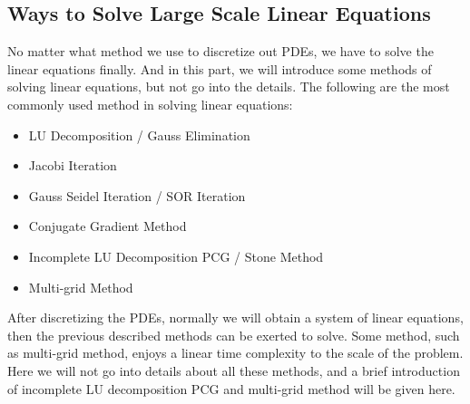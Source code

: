 \documentclass[english, nochinese]{pkupaper}
\begin{document}
\subsection{Ways to Solve Large Scale Linear Equations}
\par No matter what method we use to discretize out PDEs, we have to solve the linear equations finally. And in this part, we will introduce some methods of solving linear equations, but not go into the details. The following are the most commonly used method in solving linear equations:
\begin{itemize}
	\item LU Decomposition / Gauss Elimination
	\item Jacobi Iteration
	\item Gauss Seidel Iteration / SOR Iteration
	\item Conjugate Gradient Method
	\item Incomplete LU Decomposition PCG / Stone Method
	\item Multi-grid Method
\end{itemize}
\par After discretizing the PDEs, normally we will obtain a system of linear equations, then the previous described methods can be exerted to solve. Some method, such as multi-grid method, enjoys a linear time complexity to the scale of the problem. Here we will not go into details about all these methods, and a brief introduction of incomplete LU decomposition PCG and multi-grid method will be given here.
\end{document}
